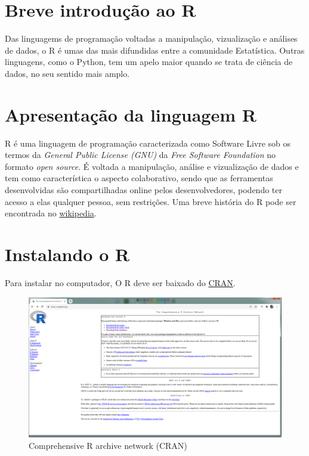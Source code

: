 \documentclass[
]{book}
\theoremstyle{definition}
\theoremstyle{definition}
\theoremstyle{definition}
\theoremstyle{remark}
\begin{document}
\hypertarget{intro}{%
\section{Breve introdução ao R}\label{intro}}

Das linguagems de programação voltadas a manipulação, vizualização e análises de dados, o R é umas das mais difundidas entre a comunidade Estatística. Outras linguagens, como o Python, tem um apelo maior quando se trata de ciência de dados, no seu sentido mais amplo.

\hypertarget{apresentauxe7uxe3o-da-linguagem-r}{%
\section{Apresentação da linguagem R}\label{apresentauxe7uxe3o-da-linguagem-r}}

R é uma linguagem de programação caracterizada como Software Livre sob os termos da \emph{General Public License (GNU)} da \emph{Free Software Foundation} no formato \emph{open source}. É voltada a manipulação, análise e vizualização de dados e tem como característica o aspecto colaborativo, sendo que as ferramentas desenvolvidas são compartilhadas online pelos desenvolvedores, podendo ter acesso a elas qualquer pessoa, sem restrições. Uma breve história do R pode ser encontrada no \href{https://pt.wikipedia.org/wiki/R_(linguagem_de_programa\%C3\%A7\%C3\%A3o)}{wikipedia}.

\hypertarget{instalando-o-r}{%
\section{Instalando o R}\label{instalando-o-r}}

Para instalar no computador, O R deve ser baixado do \href{https://cran.r-project.org/}{CRAN}.

\begin{figure}
\includegraphics[width=0.9\linewidth]{Figuras/CRAN} \caption{Comprehensive R archive network (CRAN)}\label{fig:cran}
\end{figure}
\end{document}
